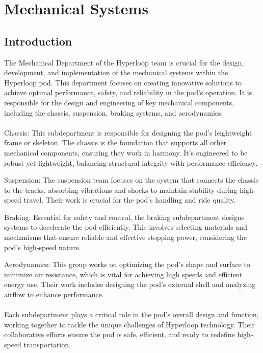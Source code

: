 \chapter{Mechanical Systems}

\section{Introduction}
The Mechanical Department of the Hyperloop team is crucial for the design, development, and implementation of the mechanical systems within the Hyperloop pod. This department focuses on creating innovative solutions to achieve optimal performance, safety, and reliability in the pod's operation. It is responsible for the design and engineering of key mechanical components, including the chassis, suspension, braking systems, and aerodynamics.\\
\\
Chassis: This subdepartment is responsible for designing the pod's leightweight frame or skeleton. The chassis is the foundation that supports all other mechanical components, ensuring they work in harmony. It's engineered to be robust yet lightweight, balancing structural integrity with performance efficiency.

Suspension: The suspension team focuses on the system that connects the chassis to the tracks, absorbing vibrations and shocks to maintain stability during high-speed travel. Their work is crucial for the pod's handling and ride quality.

Braking: Essential for safety and control, the braking subdepartment designs systems to decelerate the pod efficiently. This involves selecting materials and mechanisms that ensure reliable and effective stopping power, considering the pod's high-speed nature.

Aerodynamics: This group works on optimizing the pod's shape and surface to minimize air resistance, which is vital for achieving high speeds and efficient energy use. Their work includes designing the pod's external shell and analyzing airflow to enhance performance.\\
\\
Each subdepartment plays a critical role in the pod's overall design and function, working together to tackle the unique challenges of Hyperloop technology. Their collaborative efforts ensure the pod is safe, efficient, and ready to redefine high-speed transportation.















\newpage
